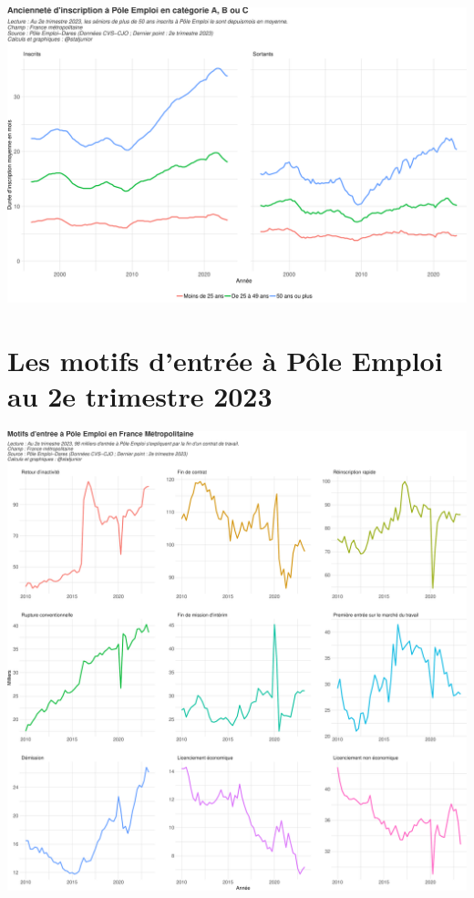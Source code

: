 \documentclass[
  paper=a4,
  ,captions=tableheading
]{scrartcl}
\begin{document}
\includegraphics{rapport_pdf_demandeurs_emploi_pole_emploi_files/figure-latex/unnamed-chunk-13-1.pdf}

\hypertarget{les-motifs-dentruxe9e-uxe0-puxf4le-emploi-au-2e-trimestre-2023}{%
\section{Les motifs d'entrée à Pôle Emploi au 2e trimestre
2023}\label{les-motifs-dentruxe9e-uxe0-puxf4le-emploi-au-2e-trimestre-2023}}

\includegraphics{rapport_pdf_demandeurs_emploi_pole_emploi_files/figure-latex/unnamed-chunk-15-1.pdf}
\end{document}
